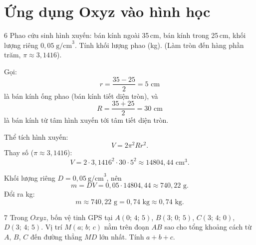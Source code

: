 \separator

\section{Ứng dụng Oxyz vào hình học}

\begin{baitoan}{6 \hfill {}}
Phao cứu sinh hình xuyến: bán kính ngoài 35\,cm, bán kính trong 25\,cm, khối lượng riêng $0{,}05\;\text{g/cm}^3$. Tính khối lượng phao (kg). (Làm tròn đến hàng phần trăm, $\pi \approx 3{,}1416$).
\end{baitoan}

\begin{loigiai}
Gọi:
\[
r=\frac{35-25}{2}=5\text{ cm}
\]
là bán kính ống phao (bán kính tiết diện tròn), và
\[
R=\frac{35+25}{2}=30\text{ cm}
\]
là bán kính từ tâm hình xuyến tới tâm tiết diện tròn.

Thể tích hình xuyến:
\[
V=2\pi^2Rr^2.
\]
Thay số ($\pi\approx 3{,}1416$):
\[
V=2\cdot 3{,}1416^2\cdot 30\cdot 5^2
\approx 14804{,}44\text{ cm}^3.
\]

Khối lượng riêng $D=0{,}05\ \text{g/cm}^3$, nên
\[
m=DV=0{,}05\cdot 14804{,}44\approx 740{,}22\text{ g}.
\]
Đổi ra kg:
\[
m \approx 740{,}22\text{ g} = 0{,}74\text{ kg} \approx \boxed{0{,}74\text{ kg}}.
\]
\end{loigiai}

\separator

\begin{baitoan}{7 \hfill {}}
Trong $Oxyz$, bốn vệ tinh GPS tại $A(0;\,4;\,5)$, $B(3;\,0;\,5)$, $C(3;\,4;\,0)$, $D(3;\,4;\,5)$. Vị trí $M(a;\,b;\,c)$ nằm trên đoạn $AB$ sao cho tổng khoảng cách từ $A$, $B$, $C$ đến đường thẳng $MD$ lớn nhất. Tính $a + b + c$.
\end{baitoan}

